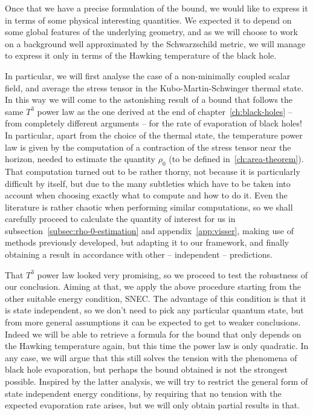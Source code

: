 Once that we have a precise formulation of the bound, we would like to express it in terms of some physical interesting quantities. We expected it to depend on some global features of the underlying geometry, and as we will choose to work on a background well approximated by the Schwarzschild metric, we will manage to express it only in terms of the Hawking temperature of the black hole.  

In particular, we will first analyse the case of a non-minimally coupled scalar field, and average the stress tensor in the Kubo-Martin-Schwinger thermal state. In this way we will come to the astonishing result of a bound that follows the same \(T^3\) power law as the one derived at the end of chapter~\ref{ch:black-holes} -- from completely different arguments -- for the rate of evaporation of black holes!
In particular, apart from the choice of the thermal state, the temperature power law is given by the computation of a contraction of the stress tensor near the horizon, needed to estimate the quantity \(\rho_0\) (to be defined in~\ref{ch:area-theorem}). That computation turned out to be rather thorny, not because it is particularly difficult by itself, but due to the many subtleties which have to be taken
into account when choosing exactly what to compute and how to do it. Even the literature is rather chaotic when performing similar computations, so we shall carefully proceed to calculate the quantity of interest for us in subsection~\ref{subsec:rho-0-estimation} and appendix~\ref{app:visser}, making use of methods previously developed, but adapting it to our framework, and finally obtaining a result in accordance with other -- independent -- predictions. 

That \(T^3\) power law looked very promising, so we proceed to test the robustness of our conclusion. Aiming at that, we apply the above procedure starting from the other suitable energy condition, SNEC. The advantage of this condition is that it is state independent, so we don't need to pick any particular quantum state, but from more general assumptions it can be expected to get to weaker conclusions. Indeed we will be able to retrieve a formula for the bound that only depends on the Hawking temperature again, but this time the power law is only quadratic.
In any case, we will argue that this still solves the tension with the phenomena of black hole evaporation, but perhaps the bound obtained is not the strongest possible.
Inspired by the latter analysis, we will try to restrict the general form of state independent energy conditions, by requiring that no tension with the expected evaporation rate arises, but we will only obtain partial results in that.

